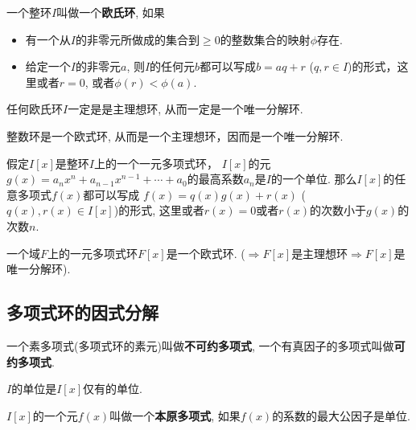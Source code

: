 \begin{Definition}[欧氏环]
一个整环$I$叫做一个\textbf{欧氏环}, 如果
\begin{itemize}
	\item 有一个从$I$的非零元所做成的集合到$\ge 0$的整数集合的映射$\phi$存在.
	\item 给定一个$I$的非零元$a$, 则$I$的任何元$b$都可以写成$b = aq +r$ ($q, r \in I$)的形式，这里或者$r = 0$, 或者$\phi(r) < \phi(a)$.
\end{itemize}
\end{Definition}

\begin{Theorem}
任何欧氏环$I$一定是是主理想环, 从而一定是一个唯一分解环.
\end{Theorem}

\begin{Note}
整数环是一个欧式环, 从而是一个主理想环，因而是一个唯一分解环.
\end{Note}

\begin{Lemma}
假定$I[x]$是整环$I$上的一个一元多项式环， $I[x]$的元$g(x) = a_n x^n + a_{n-1} x^{n-1} +\cdots + a_0$的最高系数$a_n$是$I$的一个单位. 那么$I[x]$的任意多项式$f(x)$都可以写成
$f(x) = q(x) g(x) + r(x)$ ($q(x), r(x) \in I[x]$)的形式, 这里或者$r(x) = 0$或者$r(x)$的次数小于$g(x)$的次数$n$.
\end{Lemma}

\begin{Theorem}[!]
一个域$F$上的一元多项式环$F[x]$是一个欧式环. ($\Rightarrow F[x]$是主理想环$\Rightarrow F[x]$是唯一分解环).
\end{Theorem}

\subsection{多项式环的因式分解} %

\begin{Definition}
一个素多项式(多项式环的素元)叫做\textbf{不可约多项式}, 一个有真因子的多项式叫做\textbf{可约多项式}.
\end{Definition}

\begin{Proposition}
$I$的单位是$I[x]$仅有的单位.
\end{Proposition}

\begin{Definition}[本原多项式]
$I[x]$的一个元$f(x)$叫做一个\textbf{本原多项式}, 如果$f(x)$的系数的最大公因子是单位.
\end{Definition}

